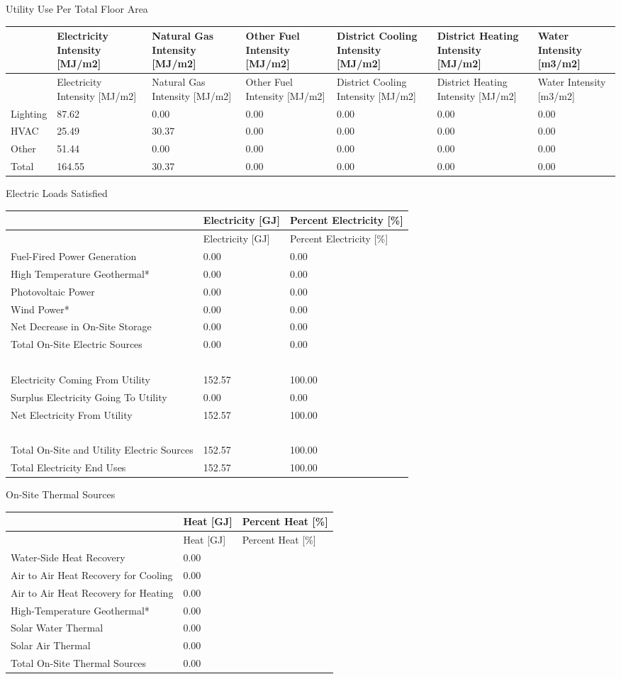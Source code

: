 Utility Use Per Total Floor Area

\begin{longtable}[c]{p{0.85in}p{0.85in}p{0.85in}p{0.85in}p{0.85in}p{0.85in}p{0.85in}}
\toprule 
~ & Electricity Intensity [MJ/m2] & Natural Gas Intensity [MJ/m2] & Other Fuel Intensity [MJ/m2] & District Cooling Intensity [MJ/m2] & District Heating Intensity [MJ/m2] & Water Intensity [m3/m2] \tabularnewline
\midrule
\endfirsthead

\toprule 
~ & Electricity Intensity [MJ/m2] & Natural Gas Intensity [MJ/m2] & Other Fuel Intensity [MJ/m2] & District Cooling Intensity [MJ/m2] & District Heating Intensity [MJ/m2] & Water Intensity [m3/m2] \tabularnewline
\midrule
\endhead

Lighting & 87.62 & 0.00 & 0.00 & 0.00 & 0.00 & 0.00 \tabularnewline
HVAC & 25.49 & 30.37 & 0.00 & 0.00 & 0.00 & 0.00 \tabularnewline
Other & 51.44 & 0.00 & 0.00 & 0.00 & 0.00 & 0.00 \tabularnewline
Total & 164.55 & 30.37 & 0.00 & 0.00 & 0.00 & 0.00 \tabularnewline
\bottomrule
\end{longtable}

Electric Loads Satisfied

\begin{longtable}[c]{p{2.9in}p{1.5in}p{1.59in}}
\toprule 
~ & Electricity [GJ] & Percent Electricity [\%] \tabularnewline
\midrule
\endfirsthead

\toprule 
~ & Electricity [GJ] & Percent Electricity [\%] \tabularnewline
\midrule
\endhead

Fuel-Fired Power Generation & 0.00 & 0.00 \tabularnewline
High Temperature Geothermal* & 0.00 & 0.00 \tabularnewline
Photovoltaic Power & 0.00 & 0.00 \tabularnewline
Wind Power* & 0.00 & 0.00 \tabularnewline
Net Decrease in On-Site Storage & 0.00 & 0.00 \tabularnewline
Total On-Site Electric Sources & 0.00 & 0.00 \tabularnewline
~ & ~ & ~ \tabularnewline
Electricity Coming From Utility & 152.57 & 100.00 \tabularnewline
Surplus Electricity Going To Utility & 0.00 & 0.00 \tabularnewline
Net Electricity From Utility & 152.57 & 100.00 \tabularnewline
~ & ~ & ~ \tabularnewline
Total On-Site and Utility Electric Sources & 152.57 & 100.00 \tabularnewline
Total Electricity End Uses & 152.57 & 100.00 \tabularnewline
\bottomrule
\end{longtable}

On-Site Thermal Sources

\begin{longtable}[c]{@{}lll@{}}
\toprule 
~ & Heat [GJ] & Percent Heat [\%] \tabularnewline
\midrule
\endfirsthead

\toprule 
~ & Heat [GJ] & Percent Heat [\%] \tabularnewline
\midrule
\endhead

Water-Side Heat Recovery & 0.00 & ~ \tabularnewline
Air to Air Heat Recovery for Cooling & 0.00 & ~ \tabularnewline
Air to Air Heat Recovery for Heating & 0.00 & ~ \tabularnewline
High-Temperature Geothermal* & 0.00 & ~ \tabularnewline
Solar Water Thermal & 0.00 & ~ \tabularnewline
Solar Air Thermal & 0.00 & ~ \tabularnewline
Total On-Site Thermal Sources & 0.00 & ~ \tabularnewline
\bottomrule
\end{longtable}

